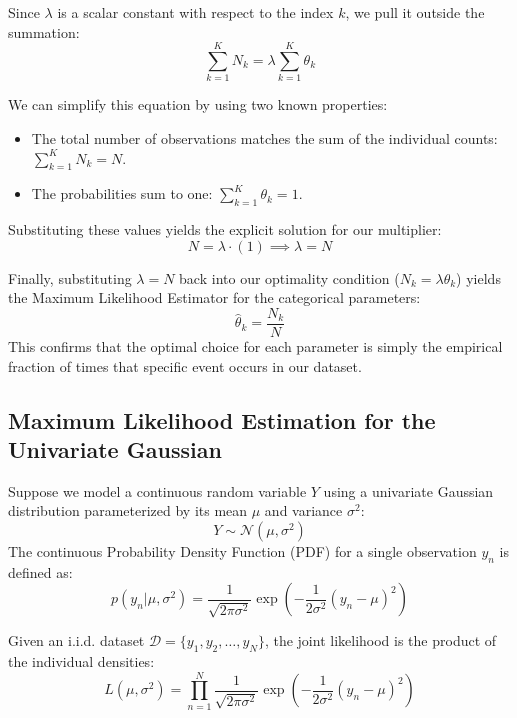 \documentclass{article}
\begin{document}
Since $\lambda$ is a scalar constant with respect to the index $k$, we pull it outside the summation:
\begin{equation}
\sum_{k=1}^K N_k = \lambda \sum_{k=1}^K \theta_k
\end{equation}

We can simplify this equation by using two known properties:
\begin{itemize}
    \item The total number of observations matches the sum of the individual counts: $\sum_{k=1}^K N_k = N$.
    \item The probabilities sum to one: $\sum_{k=1}^K \theta_k = 1$.
\end{itemize}
Substituting these values yields the explicit solution for our multiplier:
\begin{equation}
N = \lambda \cdot (1) \implies \lambda = N
\end{equation}

Finally, substituting $\lambda = N$ back into our optimality condition ($N_k = \lambda \theta_k$) yields the Maximum Likelihood Estimator for the categorical parameters:
\begin{equation}
\hat{\theta}_k = \frac{N_k}{N}
\end{equation}
This confirms that the optimal choice for each parameter is simply the empirical fraction of times that specific event occurs in our dataset.

\subsection{Maximum Likelihood Estimation for the Univariate Gaussian}

Suppose we model a continuous random variable $Y$ using a univariate Gaussian distribution parameterized by its mean $\mu$ and variance $\sigma^2$:
\begin{equation}
Y \sim \mathcal{N}(\mu, \sigma^2)
\end{equation}
The continuous Probability Density Function (PDF) for a single observation $y_n$ is defined as:
\begin{equation}
p(y_n | \mu, \sigma^2) = \frac{1}{\sqrt{2\pi\sigma^2}} \exp\left( -\frac{1}{2\sigma^2}(y_n - \mu)^2 \right)
\end{equation}

Given an i.i.d. dataset $\mathcal{D} = \{y_1, y_2, \dots, y_N\}$, the joint likelihood is the product of the individual densities:
\begin{equation}
L(\mu, \sigma^2) = \prod_{n=1}^N \frac{1}{\sqrt{2\pi\sigma^2}} \exp\left( -\frac{1}{2\sigma^2}(y_n - \mu)^2 \right)
\end{equation}
\end{document}
